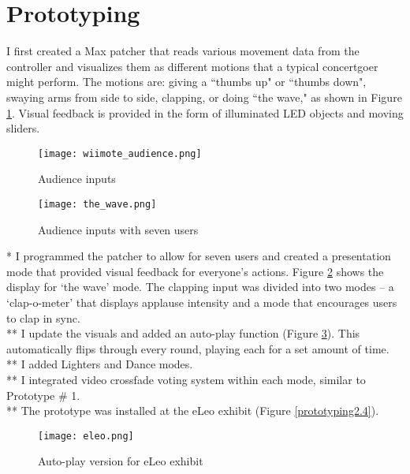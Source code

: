 \section{Prototyping}

I first created a Max patcher that reads various movement data from the controller and visualizes them as different motions that a typical concertgoer might perform. The motions are: giving a ``thumbs up" or ``thumbs down", swaying arms from side to side, clapping, or doing ``the wave," as shown in Figure \ref{prototyping2.1}. Visual feedback is provided in the form of illuminated LED objects and moving sliders.

\begin{figure}[t]
	\centering

	\texttt{[image: wiimote\_audience.png]}
	\caption{Audience inputs}

	\label{prototyping2.1}
\end{figure}

\begin{figure}[t]
	\centering

	\texttt{[image: the\_wave.png]}
	\caption{Audience inputs with seven users}

	\label{prototyping2.2}
\end{figure}

* I programmed the patcher to allow for seven users and created a presentation mode that provided visual feedback for everyone's actions. Figure \ref{prototyping2.2} shows the display for `the wave' mode. The clapping input was divided into two modes -- a `clap-o-meter' that displays applause intensity and a mode that encourages users to clap in sync.\\
** I update the visuals and added an auto-play function (Figure \ref{prototyping2.3}). This automatically flips through every round, playing each for a set amount of time.\\
** I added Lighters and Dance modes.\\
** I integrated video crossfade voting system within each mode, similar to Prototype \# 1.\\
** The prototype was installed at the eLeo exhibit (Figure \ref{prototyping2.4}).\\

\begin{figure}[t]
	\centering

	\texttt{[image: eleo.png]}
	\caption{Auto-play version for eLeo exhibit}

	\label{prototyping2.3}
\end{figure}

